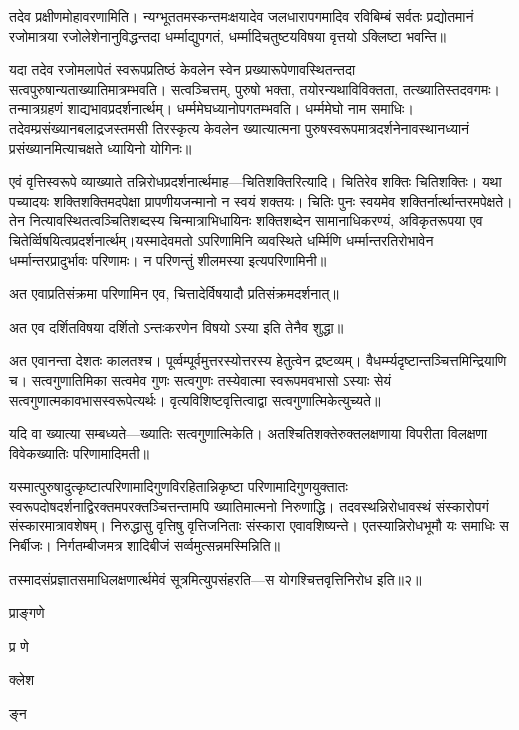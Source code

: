तदेव प्रक्षीणमोहावरणामिति। न्यग्भूततमस्कन्तमःक्षयादेव जलधारापगमादिव रविबिम्बं सर्वतः 
प्रद्योतमानं रजोमात्रया रजोलेशेनानुविद्धन्तदा धर्म्माद्युपगतं, धर्म्मादिचतुष्टयविषया वृत्तयो ऽक्लिष्टा भवन्ति॥

यदा तदेव रजोमलापेतं स्वरूपप्रतिष्ठं केवलेन स्वेन प्रख्यारूपेणावस्थितन्तदा सत्वपुरुषान्यताख्यातिमात्रम्भवति। सत्वञ्चित्तम्, 
पुरुषो भक्ता, तयोरन्यथाविविक्तता, तत्ख्यातिस्तदवगमः। तन्मात्रग्रहणं \kle शाद्यभावप्रदर्शनार्त्थम्। धर्म्ममेघध्यानोपगतम्भवति। 
धर्म्ममेघो नाम समाधिः। तदेवम्प्रसंख्यानबलाद्रजस्तमसी तिरस्कृत्य केवलेन ख्यात्यात्मना पुरुषस्वरूपमात्रदर्शनेनावस्थानध्यानं 
प्रसंख्यानमित्याचक्षते ध्यायिनो योगिनः॥

एवं वृत्तिस्वरूपे व्याख्याते तन्निरोधप्रदर्शनार्त्थमाह---चितिशक्तिरित्यादि। चितिरेव शक्तिः चितिशक्तिः। यथा पच्यादयः 
शक्तिशक्तिमदपेक्षा प्रापणीयजन्मानो न स्वयं शक्तयः। चितिः पुनः स्वयमेव शक्तिर्नार्त्थान्तरमपेक्षते। तेन 
नित्यावस्थितत्वञ्चितिशब्दस्य चिन्मात्राभिधायिनः शक्तिशब्देन सामानाधिकरण्यं, अविकृतरूपया एव 
चितेर्व्विषयित्वप्रदर्शनार्त्थम्।यस्मादेवमतो ऽपरिणामिनि व्यवस्थिते धर्म्मिणि धर्म्मान्तरतिरोभावेन धर्म्मान्तरप्रादुर्भावः 
परिणामः। न परिणन्तुं शीलमस्या इत्यपरिणामिनी॥

अत एवाप्रतिसंक्रमा परिणामिन एव, चित्तादेर्विषयादौ प्रतिसंक्रमदर्शनात्॥

अत एव दर्शितविषया दर्शितो ऽन्तःकरणेन विषयो ऽस्या इति तेनैव शुद्धा॥

अत एवानन्ता देशतः कालतश्च। पूर्व्वम्पूर्वमुत्तरस्योत्तरस्य हेतुत्वेन द्रष्टव्यम्। वैधर्म्म्यदृष्टान्तञ्चित्तमिन्द्रियाणि च। 
सत्वगुणातिमिका सत्वमेव गुणः सत्वगुणः तस्येवात्मा स्वरूपमवभासो ऽस्याः सेयं सत्वगुणात्मकावभासस्वरूपेत्यर्थः। 
वृत्यविशिष्टवृत्तित्वाद्वा सत्वगुणात्मिकेत्युच्यते॥

यदि वा ख्यात्या सम्बध्यते---ख्यातिः सत्वगुणात्मिकेति। अतश्चितिशक्तेरुक्तलक्षणाया विपरीता विलक्षणा विवेकख्यातिः 
परिणामादिमती॥

यस्मात्पुरुषादुत्कृष्टात्परिणामादिगुणविरहितान्निकृष्टा परिणामादिगुणयुक्तातः स्वरूपदोषदर्शनाद्विरक्तमपरक्तञ्चित्तन्तामपि 
ख्यातिमात्मनो निरुणाद्धि। तदवस्थन्निरोधावस्थं संस्कारोपगं संस्कारमात्रावशेषम्। निरुद्धासु वृत्तिषु वृत्तिजनिताः संस्कारा 
एवावशिष्यन्ते। एतस्यान्निरोधभूमौ यः समाधिः स निर्बीजः। निर्गतम्बीजमत्र \kle शादिबीजं सर्व्वमुत्सन्नमस्मिन्निति॥

तस्मादसंप्रज्ञातसमाधिलक्षणार्त्थमेवं सूत्रमित्युपसंहरति---स योगश्चित्तवृत्तिनिरोध इति॥२॥


प्राङ्गणे

प्र णे

क्लेश

ङ्न